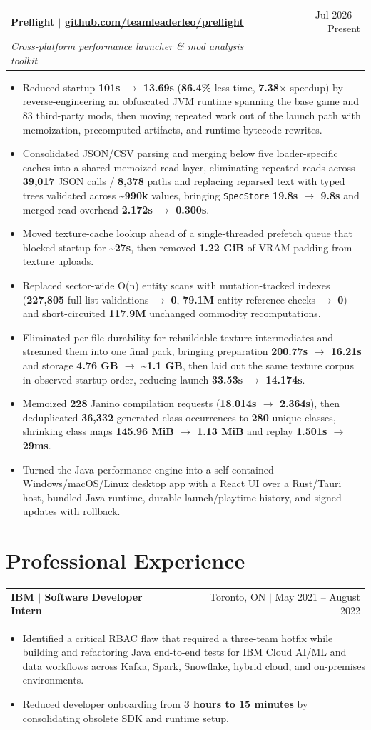 \documentclass[letterpaper,11pt]{article}
\makeatletter
\newcommand{\resumeHeading}[4]{%
  \begin{tabularx}{\textwidth}{@{}Xr@{}}
    \textbf{#1} & #2 \\
    \textit{\small #3} & \textit{\small #4}
  \end{tabularx}\vspace{-2pt}
}
\newcommand{\resumeHeadingSimple}[2]{%
  \begin{tabularx}{\textwidth}{@{}Xr@{}}
    \textbf{#1} & #2
  \end{tabularx}\vspace{-0.25pt}
}
\newcommand{\resumeItemListStart}{\begin{itemize}[leftmargin=0.23in,itemsep=1.2pt,parsep=0pt,topsep=1.0pt]}
\newcommand{\resumeItem}[1]{\item\fontsize{10.6pt}{12.2pt}\selectfont #1}
\newcommand{\resumeItemListEnd}{\end{itemize}\vspace{-0.25pt}}
\makeatother
\begin{document}
\resumeHeading
  {Preflight $|$ \href{https://github.com/teamleaderleo/preflight}{github.com/teamleaderleo/preflight}}
  {Jul 2026 -- Present}
  {\normalfont Cross-platform performance launcher \& mod analysis toolkit}
  {}
\resumeItemListStart
  \resumeItem{Reduced startup \textbf{101s $\rightarrow$ 13.69s} (\textbf{86.4\%} less time, \textbf{7.38$\times$} speedup) by reverse-engineering an obfuscated JVM runtime spanning the base game and 83 third-party mods, then moving repeated work out of the launch path with memoization, precomputed artifacts, and runtime bytecode rewrites.}
  \resumeItem{Consolidated JSON/CSV parsing and merging below five loader-specific caches into a shared memoized read layer, eliminating repeated reads across \textbf{39,017} JSON calls / \textbf{8,378} paths and replacing reparsed text with typed trees validated across \textbf{\textasciitilde990k} values, bringing \texttt{SpecStore} \textbf{19.8s $\rightarrow$ 9.8s} and merged-read overhead \textbf{2.172s $\rightarrow$ 0.300s}.}
  \resumeItem{Moved texture-cache lookup ahead of a single-threaded prefetch queue that blocked startup for \textbf{\textasciitilde27s}, then removed \textbf{1.22 GiB} of VRAM padding from texture uploads.}
  \resumeItem{Replaced sector-wide O(n) entity scans with mutation-tracked indexes (\textbf{227,805} full-list validations $\rightarrow$ \textbf{0}, \textbf{79.1M} entity-reference checks $\rightarrow$ \textbf{0}) and short-circuited \textbf{117.9M} unchanged commodity recomputations.}
  \resumeItem{Eliminated per-file durability for rebuildable texture intermediates and streamed them into one final pack, bringing preparation \textbf{200.77s $\rightarrow$ 16.21s} and storage \textbf{4.76 GB $\rightarrow$ \textasciitilde1.1 GB}, then laid out the same texture corpus in observed startup order, reducing launch \textbf{33.53s $\rightarrow$ 14.174s}.}
  \resumeItem{Memoized \textbf{228} Janino compilation requests (\textbf{18.014s $\rightarrow$ 2.364s}), then deduplicated \textbf{36,332} generated-class occurrences to \textbf{280} unique classes, shrinking class maps \textbf{145.96 MiB $\rightarrow$ 1.13 MiB} and replay \textbf{1.501s $\rightarrow$ 29ms}.}
  \resumeItem{Turned the Java performance engine into a self-contained Windows/macOS/Linux desktop app with a React UI over a Rust/Tauri host, bundled Java runtime, durable launch/playtime history, and signed updates with rollback.}
\resumeItemListEnd

\section{Professional Experience}
\resumeHeadingSimple
  {IBM $|$ Software Developer Intern}
  {Toronto, ON $|$ May 2021 -- August 2022}
\resumeItemListStart
  \resumeItem{Identified a critical RBAC flaw that required a three-team hotfix while building and refactoring Java end-to-end tests for IBM Cloud AI/ML and data workflows across Kafka, Spark, Snowflake, hybrid cloud, and on-premises environments.}
  \resumeItem{Reduced developer onboarding from \textbf{3 hours to 15 minutes} by consolidating obsolete SDK and runtime setup.}
\resumeItemListEnd
\end{document}
